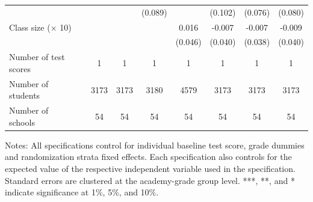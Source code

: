 \begin{center}
\begin{scriptsize}
\begin{threeparttable}
\begin{tabular} {@{} l l c c c c c c c  @{}}
                 &  &  &  & (0.089) &  & (0.102) & (0.076) & (0.080) \\
Class size ($\times$ 10) &  &  &  &  & 0.016 & -0.007 & -0.007 & -0.009 \\
                 &  &  &  &  & (0.046) & (0.040) & (0.038) & (0.040) \\
\midrule
Number of test scores &  & 1 & 1 & 1 & 1 & 1 & 1 & 1 \\
Number of students &  & 3173 & 3173 & 3180 & 4579 & 3173 & 3173 & 3173 \\
Number of schools &  & 54 & 54 & 54 & 54 & 54 & 54 & 54 \\
\bottomrule
\end{tabular}
\begin{tablenotes}
\item Notes: All specifications control for individual baseline test score, grade dummies and randomization strata fixed effects. Each specification also controls for the expected value of the respective independent variable used in the specification. Standard errors are clustered at the academy-grade group level. ***, **, and * indicate significance at 1\%, 5\%, and 10\%.\end{tablenotes}
\end{threeparttable}
\end{scriptsize}
\end{center}
\clearpage
